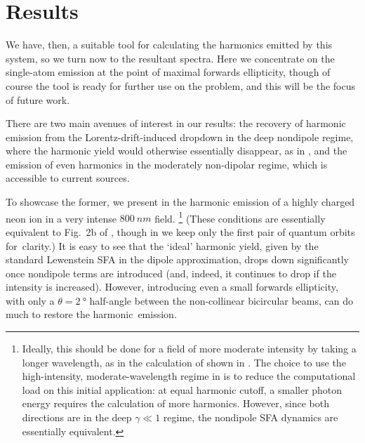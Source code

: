 \section{Results}

We have, then, a suitable tool for calculating the harmonics emitted by this system, so we turn now to the resultant spectra. Here we concentrate on the single-atom emission at the point of maximal forwards ellipticity, though of course the tool is ready for further use on the problem, and this will be the focus of future work.




There are two main avenues of interest in our results: the recovery of harmonic emission from the Lorentz-drift-induced dropdown in the deep nondipole regime, where the harmonic yield would otherwise essentially disappear, as in , and the emission of even harmonics in the moderately non-dipolar regime, which is accessible to current sources.





To showcase the former, we present in  the harmonic emission of a highly charged neon ion in a very intense $\SI{800}{nm}$ field.%
%
\footnote{%
Ideally, this should be done for a field of more moderate intensity by taking a longer wavelength, as in the calculation of  shown in . The choice to use the high-intensity, moderate-wavelength regime in  is to reduce the computational load on this initial application: at equal harmonic cutoff, a smaller photon energy requires the calculation of more harmonics. However, since both directions are in the deep $\gamma\ll1$ regime, the nondipole SFA dynamics are essentially equivalent.
}
%
(These conditions are essentially equivalent to Fig.~2b of \cite{ chirila_nondipole_2002}, though in  we keep only the first pair of quantum orbits for~clarity.)
It is easy to see that the `ideal' harmonic yield, given by the standard Lewenstein SFA in the dipole approximation, drops down significantly once nondipole terms are introduced (and, indeed, it continues to drop if the intensity is increased). However, introducing even a small forwards ellipticity, with only a $\theta=\SI{2}{\degree}$ half-angle between the non-collinear bicircular beams, can do much to restore the harmonic~emission.



